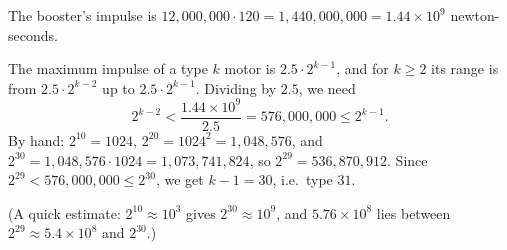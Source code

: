 The booster's impulse is $12{,}000{,}000\cdot120=1{,}440{,}000{,}000=1.44\times10^9$ newton-seconds.

The maximum impulse of a type $k$ motor is $2.5\cdot2^{k-1}$, and for $k\ge2$ its range is from $2.5\cdot2^{k-2}$ up to $2.5\cdot2^{k-1}$. Dividing by $2.5$, we need
\[
2^{k-2}<\dfrac{1.44\times10^9}{2.5}=576{,}000{,}000\le2^{k-1}.
\]
By hand: $2^{10}=1024$, $2^{20}=1024^2=1{,}048{,}576$, and $2^{30}=1{,}048{,}576\cdot1024=1{,}073{,}741{,}824$, so $2^{29}=536{,}870{,}912$. Since $2^{29}<576{,}000{,}000\le2^{30}$, we get $k-1=30$, i.e.\ type $\boxed{31}$.

(A quick estimate: $2^{10}\approx10^3$ gives $2^{30}\approx10^9$, and $5.76\times10^8$ lies between $2^{29}\approx5.4\times10^8$ and $2^{30}$.)
